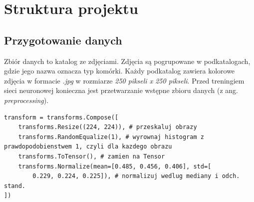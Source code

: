 

\section{Struktura projektu}

\subsection{Przygotowanie danych}

Zbiór danych to katalog ze zdjęciami. Zdjęcia są pogrupowane w podkatalogach, gdzie jego nazwa oznacza typ komórki.
Każdy podkatalog zawiera kolorowe zdjęcia w formacie \textit{.jpg} w rozmiarze \textit{250 pikseli x 250 pikseli}.
Przed treningiem sieci neuronowej konieczna jest przetwarzanie wstępne zbioru danych (z ang. \textit{preprocessing}).

\begin{lstlisting}[language=ipython,caption={Transformacja danych}, label={lst:transforms}]
transform = transforms.Compose([
    transforms.Resize((224, 224)), # przeskaluj obrazy
    transforms.RandomEqualize(1), # wyrownaj histogram z prawdopodobienstwem 1, czyli dla kazdego obrazu
    transforms.ToTensor(), # zamien na Tensor
    transforms.Normalize(mean=[0.485, 0.456, 0.406], std=[
        0.229, 0.224, 0.225]), # normalizuj wedlug mediany i odch. stand.
])
\end{lstlisting}

